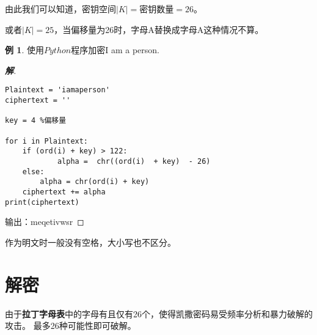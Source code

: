 \documentclass{article}
\theoremstyle{definition}
\newtheorem{example}{\indent 例}
\newenvironment{solution}{\begin{proof}[\indent\bf 解]}{\end{proof}}
\begin{document}
由此我们可以知道，密钥空间$|K| = $密钥数量$ = 26$。

或者$|K| = 25$，当偏移量为26时，字母A替换成字母A这种情况不算。


\begin{example}

使用$Python$程序加密I am a person.


\begin{solution}
\begin{lstlisting}
Plaintext = 'iamaperson'
ciphertext = ''

key = 4 %偏移量

for i in Plaintext:
    if (ord(i) + key) > 122:
            alpha =  chr((ord(i)  + key)  - 26)
    else:
        alpha = chr(ord(i) + key)
    ciphertext += alpha
print(ciphertext)
\end{lstlisting}

输出：meqetivwsr 


\end{solution}

\end{example}
 

作为明文时一般没有空格，大小写也不区分。


\section{解密}
由于\textbf{拉丁字母表}中的字母有且仅有26个，使得凯撒密码易受频率分析和暴力破解的攻击。
最多26种可能性即可破解。
\end{document}
